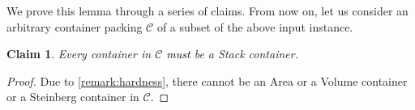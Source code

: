 \documentclass[10pt,a4paper]{amsart}
\newcommand{\kvnnew}[1]{\textcolor{black}{#1}}
\newtheorem{lemma}[theorem]{Lemma}
\newtheorem{claim}[theorem]{Claim}
\theoremstyle{definition}
\begin{document}
We prove this lemma through a series of claims. From now on, let us consider an arbitrary container packing $\mathcal C$ of a subset of the above input instance.
\begin{claim}
    Every container in $\mathcal C$ \kvnnew{must} be a Stack container.
\end{claim}
\begin{proof}
    Due to \cref{remark:hardness}, there cannot be an Area or a Volume container or a Steinberg container in $\mathcal C$. 
\end{proof}
    
    
    
\end{document}
